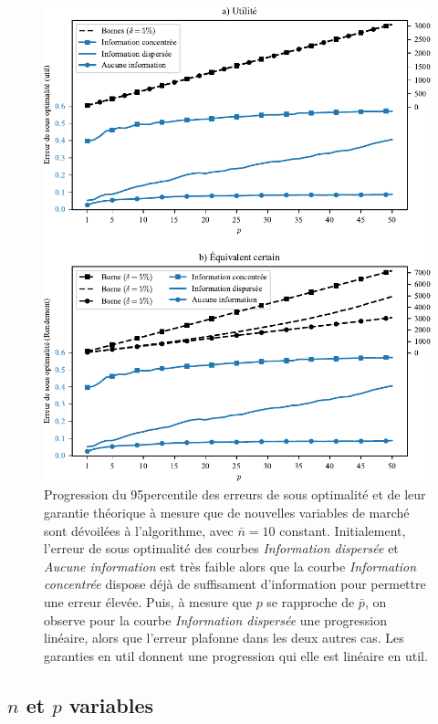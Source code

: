 \begin{figure}[h!]
  \centering
  \includegraphics[width=\textwidth]{../experiments/fig/pconst_so.pdf}
  \caption{Progression du 95\ieme percentile des erreurs de sous optimalité et de leur
    garantie théorique à mesure que de nouvelles variables de marché sont dévoilées à
    l'algorithme, avec $\bar n = 10$ constant. Initialement, l'erreur de sous optimalité
    des courbes \textit{Information dispersée} et \textit{Aucune information} est très
    faible alors que la courbe \textit{Information concentrée} dispose déjà de suffisament
    d'information pour permettre une erreur élevée. Puis, à mesure que $p$ se rapproche de
    $\bar p$, on observe pour la courbe \textit{Information dispersée} une progression
    linéaire, alors que l'erreur plafonne dans les deux autres cas. Les garanties en util
    donnent une progression qui elle est linéaire en util. }
  \label{fig_pconst_infosorelative}
\end{figure}


\clearpage

\subsection{$n$ et $p$ variables}
\label{emp:npvar}

